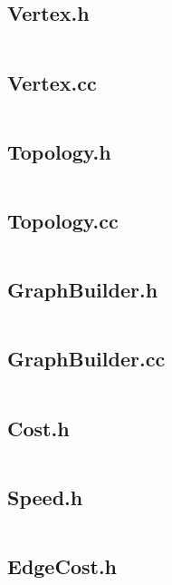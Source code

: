 \documentclass[../main.tex]{subfiles}
\begin{document}
\subsection{Vertex.h}\label{lst:graph-vertex-h}
\inputminted[linenos=true]{cpp}{parts/code/graph/Vertex.h}

\subsection{Vertex.cc}\label{lst:graph-vertex-cc}
\inputminted[linenos=true]{cpp}{parts/code/graph/Vertex.cc}

\subsection{Topology.h}\label{lst:graph-topology-h}
\inputminted[linenos=true]{cpp}{parts/code/graph/Topology.h}

\subsection{Topology.cc}\label{lst:graph-topology-cc}
\inputminted[linenos=true]{cpp}{parts/code/graph/Topology.cc}

\subsection{GraphBuilder.h}\label{lst:graph-graph-builder-h}
\inputminted[linenos=true]{cpp}{parts/code/graph/GraphBuilder.h}

\subsection{GraphBuilder.cc}\label{lst:graph-graph-builder-cc}
\inputminted[linenos=true]{cpp}{parts/code/graph/GraphBuilder.cc}

\subsection{Cost.h}\label{lst:graph-cost-h}
\inputminted[linenos=true]{cpp}{parts/code/graph/Cost.h}

\subsection{Speed.h}\label{lst:graph-speed-h}
\inputminted[linenos=true]{cpp}{parts/code/graph/Speed.h}

\subsection{EdgeCost.h}\label{lst:graph-edge-cost-h}
\inputminted[linenos=true]{cpp}{parts/code/graph/EdgeCost.h}
\end{document}
